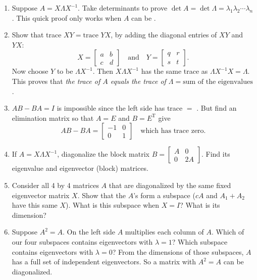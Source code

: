 \documentclass[14pt, a4paper]{article}
\begin{document}
\begin{enumerate}[resume]
    \item Suppose $A = X \Lambda X^{-1}$. Take determinants to prove $\det A = \det \Lambda = \lambda_1 \lambda_2 \cdots \lambda_n$. This quick proof only works when $A$ can be \underline{\hspace{1cm}} .

    \item Show that trace $XY = \text{trace } YX$, by adding the diagonal entries of $XY$ and $YX$:
          \[
              X = \begin{bmatrix} a & b \\ c & d \end{bmatrix} \quad \text{and} \quad Y = \begin{bmatrix} q & r \\ s & t \end{bmatrix} .
          \]
          Now choose $Y$ to be $\Lambda X^{-1}$. Then $X \Lambda X^{-1}$ has the same trace as $\Lambda X^{-1} X = \Lambda$. This proves that \textit{the trace of $A$ equals the trace of $\Lambda = \text{sum of the eigenvalues}$}.

    \item $AB - BA = I$ is impossible since the left side has trace $=$ \underline{\hspace{1cm}} . But find an elimination matrix so that $A = E$ and $B = E^{\mathrm{T}}$ give
          \[
              AB - BA = \begin{bmatrix} -1 & 0 \\ 0 & 1 \end{bmatrix} \quad \text{which has trace zero.}
          \]

    \item If $A = X \Lambda X^{-1}$, diagonalize the block matrix $B = \begin{bmatrix} A & 0 \\ 0 & 2A \end{bmatrix}$. Find its eigenvalue and eigenvector (block) matrices.

    \item Consider all 4 by 4 matrices $A$ that are diagonalized by the same fixed eigenvector matrix $X$. Show that the $A$'s form a subspace ($cA$ and $A_1 + A_2$ have this same $X$). What is this subspace when $X = I$? What is its dimension?

    \item Suppose $A^2 = A$. On the left side $A$ multiplies each column of $A$. Which of our four subspaces contains eigenvectors with $\lambda = 1$? Which subspace contains eigenvectors with $\lambda = 0$? From the dimensions of those subspaces, $A$ has a full set of independent eigenvectors. So a matrix with $A^2 = A$ can be diagonalized.


\end{enumerate}
\end{document}
